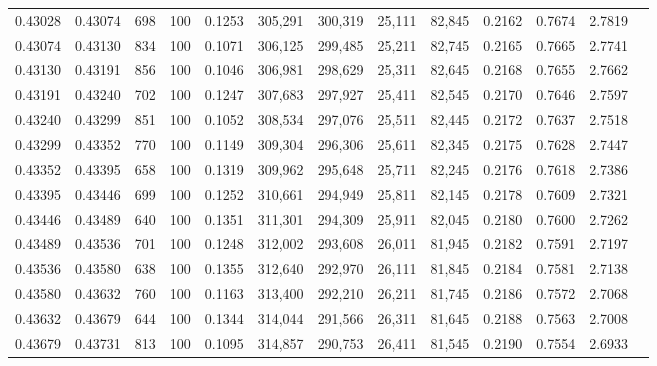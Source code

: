 \begin{tabular}{rrrrrrrrrrrrr}
0.43028 & 0.43074 &   698 & 100 &                                     0.1253 & 305,291 & 300,319 &  25,111 &  82,845 & 0.2162 & 0.7674 & 2.7819 \\
0.43074 & 0.43130 &   834 & 100 &                                     0.1071 & 306,125 & 299,485 &  25,211 &  82,745 & 0.2165 & 0.7665 & 2.7741 \\
0.43130 & 0.43191 &   856 & 100 &                                     0.1046 & 306,981 & 298,629 &  25,311 &  82,645 & 0.2168 & 0.7655 & 2.7662 \\
0.43191 & 0.43240 &   702 & 100 &                                     0.1247 & 307,683 & 297,927 &  25,411 &  82,545 & 0.2170 & 0.7646 & 2.7597 \\
0.43240 & 0.43299 &   851 & 100 &                                     0.1052 & 308,534 & 297,076 &  25,511 &  82,445 & 0.2172 & 0.7637 & 2.7518 \\
0.43299 & 0.43352 &   770 & 100 &                                     0.1149 & 309,304 & 296,306 &  25,611 &  82,345 & 0.2175 & 0.7628 & 2.7447 \\
0.43352 & 0.43395 &   658 & 100 &                                     0.1319 & 309,962 & 295,648 &  25,711 &  82,245 & 0.2176 & 0.7618 & 2.7386 \\
0.43395 & 0.43446 &   699 & 100 &                                     0.1252 & 310,661 & 294,949 &  25,811 &  82,145 & 0.2178 & 0.7609 & 2.7321 \\
0.43446 & 0.43489 &   640 & 100 &                                     0.1351 & 311,301 & 294,309 &  25,911 &  82,045 & 0.2180 & 0.7600 & 2.7262 \\
0.43489 & 0.43536 &   701 & 100 &                                     0.1248 & 312,002 & 293,608 &  26,011 &  81,945 & 0.2182 & 0.7591 & 2.7197 \\
0.43536 & 0.43580 &   638 & 100 &                                     0.1355 & 312,640 & 292,970 &  26,111 &  81,845 & 0.2184 & 0.7581 & 2.7138 \\
0.43580 & 0.43632 &   760 & 100 &                                     0.1163 & 313,400 & 292,210 &  26,211 &  81,745 & 0.2186 & 0.7572 & 2.7068 \\
0.43632 & 0.43679 &   644 & 100 &                                     0.1344 & 314,044 & 291,566 &  26,311 &  81,645 & 0.2188 & 0.7563 & 2.7008 \\
0.43679 & 0.43731 &   813 & 100 &                                     0.1095 & 314,857 & 290,753 &  26,411 &  81,545 & 0.2190 & 0.7554 & 2.6933 \\

\end{tabular}
